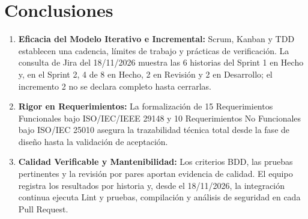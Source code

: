 \documentclass[11pt,a4paper]{article}
\begin{document}
\section{Conclusiones}
\begin{enumerate}[leftmargin=*]
    \item \textbf{Eficacia del Modelo Iterativo e Incremental:} Scrum, Kanban y TDD establecen una cadencia, límites de trabajo y prácticas de verificación. La consulta de Jira del 18/11/2026 muestra las 6 historias del Sprint 1 en Hecho y, en el Sprint 2, 4 de 8 en Hecho, 2 en Revisión y 2 en Desarrollo; el incremento 2 no se declara completo hasta cerrarlas.
    \item \textbf{Rigor en Requerimientos:} La formalización de 15 Requerimientos Funcionales bajo ISO/IEC/IEEE 29148 y 10 Requerimientos No Funcionales bajo ISO/IEC 25010 asegura la trazabilidad técnica total desde la fase de diseño hasta la validación de aceptación.
    \item \textbf{Calidad Verificable y Mantenibilidad:} Los criterios BDD, las pruebas pertinentes y la revisión por pares aportan evidencia de calidad. El equipo registra los resultados por historia y, desde el 18/11/2026, la integración continua ejecuta Lint y pruebas, compilación y análisis de seguridad en cada Pull Request.
\end{enumerate}



\end{document}
